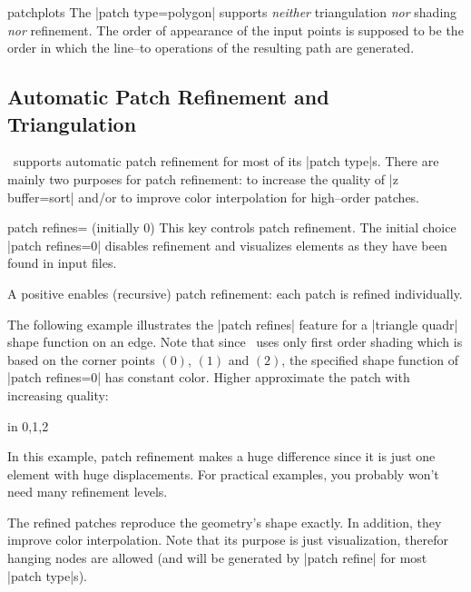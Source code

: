 {\begin{pgfplotslibrary}{patchplots}
	The |patch type=polygon| supports \emph{neither} triangulation \emph{nor} shading \emph{nor} refinement. The order of appearance of the input points is supposed to be the order in which the line--to operations of the resulting path are generated.




\subsection{Automatic Patch Refinement and Triangulation}
\label{sec:lib:patchplots:refinement}
\PGFPlots\ supports automatic patch refinement for most of its |patch type|s. There are mainly two purposes for patch refinement: to increase the quality of |z buffer=sort| and/or to improve color interpolation for high--order patches. 

\begin{pgfplotskey}{patch refines= (initially 0)}
	This key controls patch refinement. The initial choice |patch refines=0| disables refinement and visualizes elements as they have been found in input files.

	A positive  enables (recursive) patch refinement: each patch is refined individually. 

	The following example illustrates the |patch refines| feature for a |triangle quadr| shape function on an edge. Note that since \PGFPlots\ uses only first order shading which is based on the corner points $(0)$, $(1)$ and $(2)$, the specified shape function of |patch refines=0| has constant color. Higher  approximate the patch with increasing quality:
\begin{codeexample}[]
\foreach \level in {0,1,2} {%
}
\end{codeexample}
	\noindent In this example, patch refinement makes a huge difference since it is just one element with huge displacements. For practical examples, you probably won't need many refinement levels.
	
	The refined patches reproduce the geometry's shape exactly. In addition, they improve color interpolation. Note that its purpose is just visualization, therefor hanging nodes are allowed (and will be generated by |patch refine| for most |patch type|s).


\end{pgfplotskey}
\end{pgfplotslibrary}}
